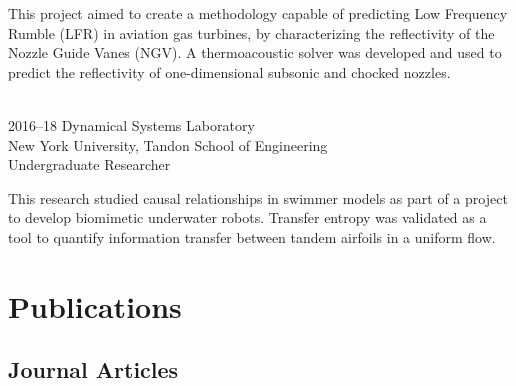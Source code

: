 \documentclass[12pt,letterpaper]{report}
\newcommand{\listitemspace}{0.25em}
\renewenvironment{itemize}
{\begin{list}{}{\setlength{\leftmargin}{0em}
                \setlength{\parskip}{0em}
                \setlength{\itemsep}{\listitemspace}
                \setlength{\parsep}{\listitemspace}}}
{\end{list}}
\begin{document}
\begin{tablist}
		This project aimed to create a methodology capable of
predicting Low Frequency Rumble (LFR) in aviation gas turbines, by characterizing the reflectivity of the Nozzle Guide Vanes (NGV). A thermoacoustic solver was developed and used to predict the reflectivity of one-dimensional subsonic and chocked nozzles. \\\ 

        \item[2016--18] \tab{}Dynamical Systems Laboratory \\ 
        New York University, Tandon School of Engineering \\ 
        Undergraduate Researcher \\
        
  \vspace{1.5mm}
  
        This research studied causal relationships in swimmer models as part of a project to develop biomimetic underwater robots. Transfer entropy was validated as a tool to quantify  information transfer between tandem airfoils in a uniform flow. 

    \end{tablist}


%
%
%



    \section*{Publications}
    
    \subsection*{Journal Articles}
        \nocite{*}
        \printbibliography[type=article,heading=none,resetnumbers, notkeyword=abstract,nottype=url,nottype=doi]
\end{document}
